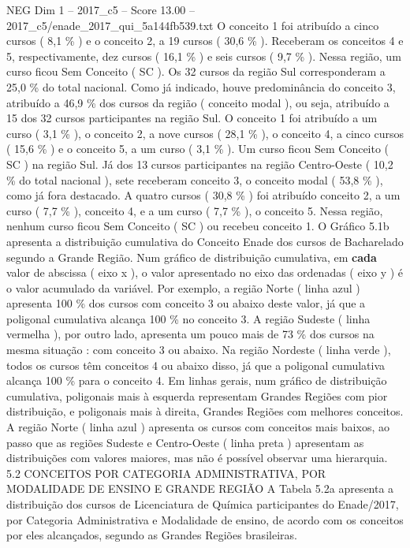 \begin{textsample}{NEG Dim 1 – 2017\_c5 – Score 13.00 – 2017\_c5/enade\_2017\_qui\_5a144fb539.txt}
O conceito 1 foi atribuído a cinco cursos ( 8,1 \% ) e o conceito 2, a 19 cursos ( 30,6 \% ).
Receberam os conceitos 4 e 5, respectivamente, dez cursos ( 16,1 \% ) e seis cursos ( 9,7 \% ).
Nessa região, um curso ficou Sem Conceito ( SC ).
Os 32 cursos da região Sul corresponderam a 25,0 \% do total nacional.
Como já indicado, houve predominância do conceito 3, atribuído a 46,9 \% dos cursos da região ( conceito modal ), ou seja, atribuído a 15 dos 32 cursos participantes na região Sul.
O conceito 1 foi atribuído a um curso ( 3,1 \% ), o conceito 2, a nove cursos ( 28,1 \% ), o conceito 4, a cinco cursos ( 15,6 \% ) e o conceito 5, a um curso ( 3,1 \% ).
Um curso ficou Sem Conceito ( SC ) na região Sul.
Já dos 13 cursos participantes na região Centro-Oeste ( 10,2 \% do total nacional ), sete receberam conceito 3, o conceito modal ( 53,8 \% ), como já fora destacado.
A quatro cursos ( 30,8 \% ) foi atribuído conceito 2, a um curso ( 7,7 \% ), conceito 4, e a um curso ( 7,7 \% ), o conceito 5.
Nessa região, nenhum curso ficou Sem Conceito ( SC ) ou recebeu conceito 1.
O Gráfico 5.1b apresenta a distribuição cumulativa do Conceito Enade dos cursos de Bacharelado segundo a Grande Região.
Num gráfico de distribuição cumulativa, em \textbf{cada} valor de abscissa ( eixo x ), o valor apresentado no eixo das ordenadas ( eixo y ) é o valor acumulado da variável.
Por exemplo, a região Norte ( linha azul ) apresenta 100 \% dos cursos com conceito 3 ou abaixo deste valor, já que a poligonal cumulativa alcança 100 \% no conceito 3.
A região Sudeste ( linha vermelha ), por outro lado, apresenta um pouco mais de 73 \% dos cursos na mesma situação : com conceito 3 ou abaixo.
Na região Nordeste ( linha verde ), todos os cursos têm conceitos 4 ou abaixo disso, já que a poligonal cumulativa alcança 100 \% para o conceito 4.
Em linhas gerais, num gráfico de distribuição cumulativa, poligonais mais à esquerda representam Grandes Regiões com pior distribuição, e poligonais mais à direita, Grandes Regiões com melhores conceitos.
A região Norte ( linha azul ) apresenta os cursos com conceitos mais baixos, ao passo que as regiões Sudeste e Centro-Oeste ( linha preta ) apresentam as distribuições com valores maiores, mas não é possível observar uma hierarquia. 5.2 CONCEITOS POR CATEGORIA ADMINISTRATIVA, POR MODALIDADE DE ENSINO E GRANDE REGIÃO A Tabela 5.2a apresenta a distribuição dos cursos de Licenciatura de Química participantes do Enade/2017, por Categoria Administrativa e Modalidade de ensino, de acordo com os conceitos por eles alcançados, segundo as Grandes Regiões brasileiras.

\end{textsample}
